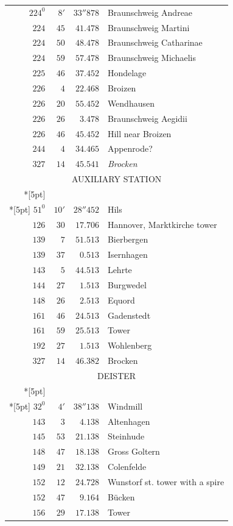 \clearpage
{}%
\begingroup
\fontsize{10.5}{13}\selectfont
\setlength{\tabcolsep}{3pt}
\setlength{\LTpre}{2pt}
\setlength{\LTpost}{2pt}
\begin{longtable}{@{}rrrp{.61\linewidth}@{}}
\(224^{0}\)&\(8'\)&\(33''878\)&\raggedright Braunschweig Andreae\tabularnewline
\(224\)&\(45\)&\(41.478\)&\raggedright Braunschweig Martini\tabularnewline
\(224\)&\(50\)&\(48.478\)&\raggedright Braunschweig Catharinae\tabularnewline
\(224\)&\(59\)&\(57.478\)&\raggedright Braunschweig Michaelis\tabularnewline
\(225\)&\(46\)&\(37.452\)&\raggedright Hondelage\tabularnewline
\(226\)&\(4\)&\(22.468\)&\raggedright Broizen\tabularnewline
\(226\)&\(20\)&\(55.452\)&\raggedright Wendhausen\tabularnewline
\(226\)&\(26\)&\(3.478\)&\raggedright Braunschweig Aegidii\tabularnewline
\(226\)&\(46\)&\(45.452\)&\raggedright Hill near Broizen\tabularnewline
\(244\)&\(4\)&\(34.465\)&\raggedright Appenrode?\tabularnewline
\(327\)&\(14\)&\(45.541\)&\raggedright \textit{Brocken}\tabularnewline
\multicolumn{4}{c}{\strut AUXILIARY STATION}\\*[5pt]
\multicolumn{4}{c}{\(-66001.465\)\qquad\(-23458.558\)}\\*[5pt]
\(51^{0}\)&\(10'\)&\(28''452\)&\raggedright Hils\tabularnewline
\(126\)&\(30\)&\(17.706\)&\raggedright Hannover, Marktkirche tower\tabularnewline
\(139\)&\(7\)&\(51.513\)&\raggedright Bierbergen\tabularnewline
\(139\)&\(37\)&\(0.513\)&\raggedright Isernhagen\tabularnewline
\(143\)&\(5\)&\(44.513\)&\raggedright Lehrte\tabularnewline
\(144\)&\(27\)&\(1.513\)&\raggedright Burgwedel\tabularnewline
\(148\)&\(26\)&\(2.513\)&\raggedright Equord\tabularnewline
\(161\)&\(46\)&\(24.513\)&\raggedright Gadenstedt\tabularnewline
\(161\)&\(59\)&\(25.513\)&\raggedright Tower\tabularnewline
\(192\)&\(27\)&\(1.513\)&\raggedright Wohlenberg\tabularnewline
\(327\)&\(14\)&\(46.382\)&\raggedright Brocken\tabularnewline
\multicolumn{4}{c}{\strut DEISTER}\\*[5pt]
\multicolumn{4}{c}{\(-78478.377\)\qquad\(+23444.173\)}\\*[5pt]
\(32^{0}\)&\(4'\)&\(38''138\)&\raggedright Windmill\tabularnewline
\(143\)&\(3\)&\(4.138\)&\raggedright Altenhagen\tabularnewline
\(145\)&\(53\)&\(21.138\)&\raggedright Steinhude\tabularnewline
\(148\)&\(47\)&\(18.138\)&\raggedright Gross Goltern\tabularnewline
\(149\)&\(21\)&\(32.138\)&\raggedright Colenfelde\tabularnewline
\(152\)&\(12\)&\(24.728\)&\raggedright Wunstorf st. tower with a spire\tabularnewline
\(152\)&\(47\)&\(9.164\)&\raggedright Bücken\tabularnewline
\(156\)&\(29\)&\(17.138\)&\raggedright Tower\tabularnewline

\end{longtable}
